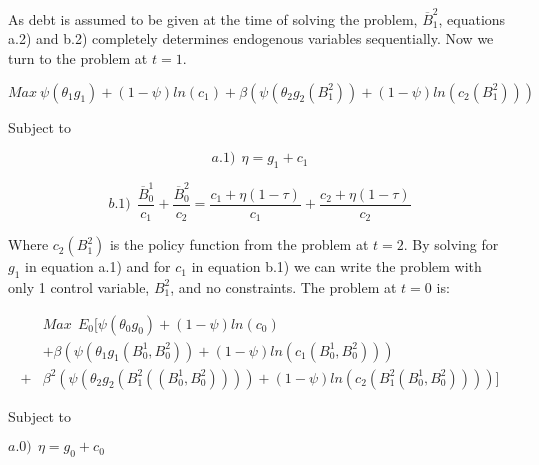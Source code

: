\documentclass[11pt,letterpaper]{article}
\begin{document}
As debt is assumed to be given at the time of solving the problem, $\overline{B}^{2}_{1}$, equations a.2) and b.2) completely determines endogenous variables sequentially. Now we turn to the problem at $t=1$.

\bigskip


\begin{center}

$Max \ \psi(\theta _1g_1)+ (1-\psi)ln(c_1)+ \beta(\psi(\theta _2g_2\left ( B^{2}_{1} \right ))+ (1-\psi)ln(c_2\left ( B^{2}_{1} \right )))$

\end{center}

\bigskip

Subject to

\begin{equation*}
 a.1) \ \  \eta=g_1+c_1
\end{equation*}


\bigskip

\begin{equation*}
 b.1) \ \ \frac{\overline{B}^{1}_{0}}{c_1}+\frac{\overline{B}^{2}_{0}}{c_2}=\frac{c_1+\eta (1-\tau )}{c_1}+\frac{c_2+\eta (1-\tau )}{c_2}
\end{equation*}


\bigskip

Where $c_2\left ( B^{2}_{1} \right )$ is the policy function from the problem at $t=2$. By solving for $g_1$ in equation a.1) and for $c_1$ in equation b.1) we can write the problem with only 1 control variable, $B^{2}_{1}$, and no constraints. The problem at $t=0$ is:

\bigskip

\begin{equation*}
\begin{split}
 & Max \ \  E_0[ \psi(\theta _0g_0)+ (1-\psi)ln(c_0)\\
&+\beta(\psi(\theta _1g_1({B}^{1}_{0},{B}^{2}_{0}))+ (1-\psi)ln(c_1({B}^{1}_{0},{B}^{2}_{0})))\\
+ & \beta^2(\psi(\theta _2g_2\left ( B^{2}_{1}(({B}^{1}_{0},{B}^{2}_{0})) \right ))+ (1-\psi)ln(c_2\left ( B^{2}_{1}({B}^{1}_{0},{B}^{2}_{0}) \right )))]
\end{split}
\end{equation*}



\bigskip

Subject to

\begin{center}

$a.0) \ \  \eta=g_0+c_0  $

\end{center}
\end{document}
